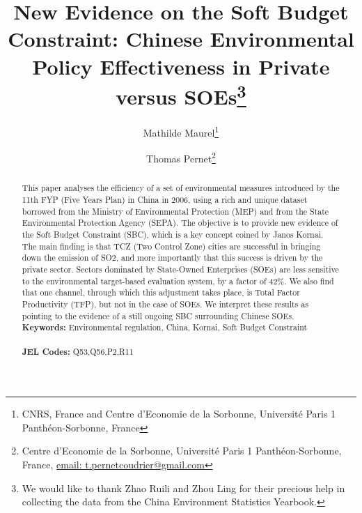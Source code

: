 \documentclass[12pt]{article}
\begin{document}
\begin{titlepage}


\title{New Evidence on the Soft Budget Constraint: Chinese Environmental Policy Effectiveness in Private versus SOEs\thanks{We would like to thank Zhao Ruili and Zhou Ling for their precious help in collecting the data from the China Environment Statistics Yearbook.}}
\author{
Mathilde Maurel\thanks{CNRS, France and Centre d'Economie de la Sorbonne, Université Paris 1 Panthéon-Sorbonne, France} 
\and Thomas Pernet\thanks{Centre d'Economie de la Sorbonne, Université Paris 1 Panthéon-Sorbonne, France,
\href{mailto:t.pernetcoudrier@gmail.com}{email: t.pernetcoudrier@gmail.com} 
}
}

\date{}

\maketitle
\begin{abstract}
\noindent This paper analyses the efficiency of a set of environmental measures introduced by the 11th FYP (Five Years Plan) in China in 2006, using a rich and unique dataset borrowed from the Ministry of Environmental Protection (MEP) and from the State Environmental Protection Agency (SEPA). The objective is to provide new evidence of the Soft Budget Constraint (SBC), which is a key concept coined by Janos Kornai. The main finding is that TCZ (Two Control Zone) cities are successful in bringing down the emission of SO2, and more importantly that this success is driven by the private sector. Sectors dominated by State-Owned Enterprises (SOEs) are less sensitive to the environmental target-based evaluation system, by a factor of 42\%. We also find that one channel, through which this adjustment takes place, is Total Factor Productivity (TFP), but not in the case of SOEs. We interpret these results as pointing to the evidence of a still ongoing SBC surrounding Chinese SOEs.  
\vspace{0em}\\
\noindent\textbf{Keywords:} Environmental regulation, China, Kornai, Soft Budget Constraint\\
\vspace{0em}\\
\noindent\textbf{JEL Codes:} Q53,Q56,P2,R11
\\

\bigskip
\end{abstract}
\setcounter{page}{0}
\thispagestyle{empty}
\end{titlepage}
\pagebreak \newpage
\end{document}
